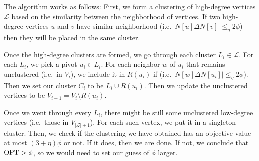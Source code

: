 
The algorithm works as follows: First, we form a clustering of high-degree vertices $\mathcal{L}$ based on the similarity between the neighborhood of vertices. If two high-degree vertices $u$ and $v$ have similar neighborhood (i.e.~$N[u] \Delta N[v]| \leq_{\eta} 2\phi$) then they will be placed in the same cluster. 

Once the high-degree clusters are formed, we go through each cluster $L_i \in \mathcal{L}$. For each $L_i$, we pick a pivot $u_i \in L_i$. For each neighbor $w$ of $u_i$ that remains unclustered (i.e.~in $V_i$), we include it in $R(u_i)$ if (i.e.~$N[w] \Delta N[u_i]| \leq_{\eta} 2\phi$). Then we set our cluster $C_i$ to be $L_i \cup R(u_i)$. Then we update the unclustered vertices to be $V_{i+1} = V_{i} \setminus R(u_i)$. 

Once we went through every $L_i$, there might be still some unclustered low-degree vertices (i.e.~those in $V_{|\mathcal{L}|+1}$). For each such vertex, we put it in a singleton cluster. Then, we check if the clustering we have obtained has an objective value at most $(3+\eta)\phi$ or not. If it does, then we are done. If not, we conclude that $\mathrm{OPT} > \phi$, so we would need to set our guess of $\phi$ larger.

